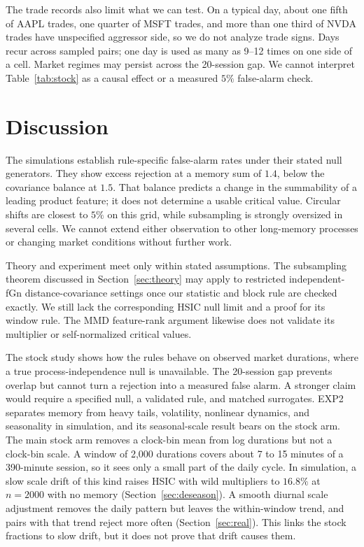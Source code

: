\documentclass[11pt]{article}
\theoremstyle{remark}
\begin{document}
The trade records also limit what we can test. On a typical day, about one fifth of AAPL trades, one quarter of MSFT trades, and more than one third of NVDA trades have unspecified aggressor side, so we do not analyze trade signs. Days recur across sampled pairs; one day is used as many as 9--12 times on one side of a cell. Market regimes may persist across the 20-session gap. We cannot interpret Table~\ref{tab:stock} as a causal effect or a measured $5\%$ false-alarm check.

\section{Discussion}
The simulations establish rule-specific false-alarm rates under their stated null generators. They show excess rejection at a memory sum of $1.4$, below the covariance balance at $1.5$. That balance predicts a change in the summability of a leading product feature; it does not determine a usable critical value. Circular shifts are closest to $5\%$ on this grid, while subsampling is strongly oversized in several cells. We cannot extend either observation to other long-memory processes or changing market conditions without further work.

Theory and experiment meet only within stated assumptions. The subsampling theorem discussed in Section~\ref{sec:theory} may apply to restricted independent-fGn distance-covariance settings once our statistic and block rule are checked exactly. We still lack the corresponding HSIC null limit and a proof for its window rule. The MMD feature-rank argument likewise does not validate its multiplier or self-normalized critical values.

The stock study shows how the rules behave on observed market durations, where a true process-independence null is unavailable. The 20-session gap prevents overlap but cannot turn a rejection into a measured false alarm. A stronger claim would require a specified null, a validated rule, and matched surrogates. EXP2 separates memory from heavy tails, volatility, nonlinear dynamics, and seasonality in simulation, and its seasonal-scale result bears on the stock arm. The main stock arm removes a clock-bin mean from log durations but not a clock-bin scale. A window of 2,000 durations covers about 7 to 15 minutes of a 390-minute session, so it sees only a small part of the daily cycle. In simulation, a slow scale drift of this kind raises HSIC with wild multipliers to $16.8\%$ at $n=2000$ with no memory (Section~\ref{sec:deseason}). A smooth diurnal scale adjustment removes the daily pattern but leaves the within-window trend, and pairs with that trend reject more often (Section~\ref{sec:real}). This links the stock fractions to slow drift, but it does not prove that drift causes them.
\end{document}
